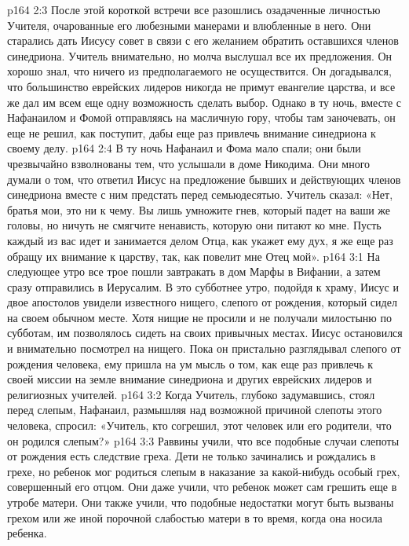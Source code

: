 \vs p164 2:3 После этой короткой встречи все разошлись озадаченные личностью Учителя, очарованные его любезными манерами и влюбленные в него. Они старались дать Иисусу совет в связи с его желанием обратить оставшихся членов синедриона. Учитель внимательно, но молча выслушал все их предложения. Он хорошо знал, что ничего из предполагаемого не осуществится. Он догадывался, что большинство еврейских лидеров никогда не примут евангелие царства, и все же дал им всем еще одну возможность сделать выбор. Однако в ту ночь, вместе с Нафанаилом и Фомой отправляясь на масличную гору, чтобы там заночевать, он еще не решил, как поступит, дабы еще раз привлечь внимание синедриона к своему делу.
\vs p164 2:4 В ту ночь Нафанаил и Фома мало спали; они были чрезвычайно взволнованы тем, что услышали в доме Никодима. Они много думали о том, что ответил Иисус на предложение бывших и действующих членов синедриона вместе с ним предстать перед семьюдесятью. Учитель сказал: «Нет, братья мои, это ни к чему. Вы лишь умножите гнев, который падет на ваши же головы, но ничуть не смягчите ненависть, которую они питают ко мне. Пусть каждый из вас идет и занимается делом Отца, как укажет ему дух, я же еще раз обращу их внимание к царству, так, как повелит мне Отец мой».
\vs p164 3:1 На следующее утро все трое пошли завтракать в дом Марфы в Вифании, а затем сразу отправились в Иерусалим. В это субботнее утро, подойдя к храму, Иисус и двое апостолов увидели известного нищего, слепого от рождения, который сидел на своем обычном месте. Хотя нищие не просили и не получали милостыню по субботам, им позволялось сидеть на своих привычных местах. Иисус остановился и внимательно посмотрел на нищего. Пока он пристально разглядывал слепого от рождения человека, ему пришла на ум мысль о том, как еще раз привлечь к своей миссии на земле внимание синедриона и других еврейских лидеров и религиозных учителей.
\vs p164 3:2 Когда Учитель, глубоко задумавшись, стоял перед слепым, Нафанаил, размышляя над возможной причиной слепоты этого человека, спросил: «Учитель, кто согрешил, этот человек или его родители, что он родился слепым?»
\vs p164 3:3 \pc Раввины учили, что все подобные случаи слепоты от рождения есть следствие греха. Дети не только зачинались и рождались в грехе, но ребенок мог родиться слепым в наказание за какой\hyp{}нибудь особый грех, совершенный его отцом. Они даже учили, что ребенок может сам грешить еще в утробе матери. Они также учили, что подобные недостатки могут быть вызваны грехом или же иной порочной слабостью матери в то время, когда она носила ребенка.
